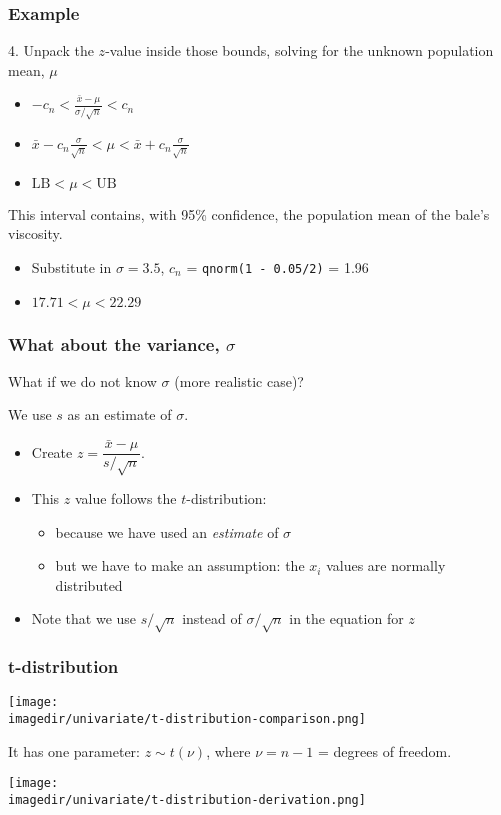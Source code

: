 \begin{frame}\frametitle{Example}

	4. Unpack the $z$-value inside those bounds, solving for the unknown population mean, $\mu$
	\begin{itemize}
		\item$\displaystyle - c_n < \frac{\bar{x} - \mu}{\sigma / \sqrt{n}} < c_n$ \pause
		\item$\displaystyle \bar{x} - c_n\frac{\sigma}{\sqrt{n}} < \mu < \bar{x} + c_n\frac{\sigma}{\sqrt{n}}$ \pause
		\item$\displaystyle \text{LB} < \mu < \text{UB}$
	\end{itemize}

	This interval contains, with 95\% confidence, the population mean of the bale's viscosity.
	\begin{itemize}
		\item Substitute in $\sigma = 3.5$, $c_n$ = \texttt{qnorm(1 - 0.05/2)} = 1.96
		\item$17.71 < \mu < 22.29$
	\end{itemize}
\end{frame}

\begin{frame}\frametitle{What about the variance, $\sigma$}

	What if we do not know $\sigma$ (more realistic case)?\pause

	We use $s$ as an estimate of $\sigma$.
	\begin{itemize}
		\item Create $z = \dfrac{\bar{x} - \mu}{s/\sqrt{n}}$.
		\item This $z$ value follows the $t$-distribution:
		\begin{itemize}
			\item because we have used an \emph{estimate} of $\sigma$
			\item but we have to make an assumption: the $x_i$ values are normally distributed
		\end{itemize}
		\item Note that we use $s/\sqrt{n}$ instead of $\sigma/\sqrt{n}$ in the equation for $z$
	\end{itemize}
\end{frame}

\begin{frame}\frametitle{t-distribution}

	\texttt{[image: \\imagedir/univariate/t-distribution-comparison.png]}

	It has one parameter: $z \sim t\left(\nu\right)$, where $\nu = n-1$ = degrees of freedom.

	\texttt{[image: \\imagedir/univariate/t-distribution-derivation.png]}
\end{frame}

